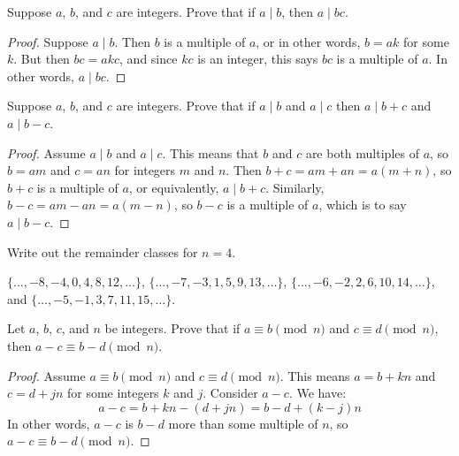 
\begin{questions}
\question Suppose $a$, $b$, and $c$ are integers.  Prove that if $a \mid b$, then $a \mid bc$.

	\begin{answer}
		\begin{proof}
			Suppose $a \mid b$.  Then $b$ is a multiple of $a$, or in other words, $b = ak$ for some $k$.  But then $bc = akc$, and since $kc$ is an integer, this says $bc$ is a multiple of $a$.  In other words, $a \mid bc$.
		\end{proof}
	\end{answer}
	
	
	
	
	

\question Suppose $a$, $b$, and $c$ are integers.  Prove that if $a \mid b$ and $a \mid c$ then $a \mid b+c$ and $a \mid b-c$.

	\begin{answer}
		\begin{proof}
			Assume $a \mid b$ and $a \mid c$.  This means that $b$ and $c$ are both multiples of $a$, so $b = am$ and $c = an$ for integers $m$ and $n$.  Then $b+c = am+an = a(m+n)$, so $b+c$ is a multiple of $a$, or equivalently, $a \mid b+c$.  Similarly, $b-c = am-an = a(m-n)$, so $b-c$ is a multiple of $a$, which is to say $a \mid b-c$.
		\end{proof}
	\end{answer}
	






\question Write out the remainder classes for $n = 4$.

	\begin{answer}
		$\{\ldots, -8, -4, 0, 4, 8, 12, \ldots\}$, $\{\ldots, -7, -3, 1, 5, 9, 13, \ldots\}$, $\{\ldots, -6, -2, 2, 6, 10, 14, \ldots\}$,\\ and $\{\ldots, -5, -1, 3, 7, 11, 15, \ldots\}$.
	\end{answer}
	
	





\question Let $a$, $b$, $c$, and $n$ be integers.  Prove that if $a \equiv b \pmod{n}$ and $c \equiv d \pmod{n}$, then $a-c \equiv b-d \pmod{n}$.

	\begin{answer}
		\begin{proof}
			Assume $a \equiv b \pmod n$ and $c \equiv d \pmod n$.  This means $a = b + kn$ and $c = d + jn$ for some integers $k$ and $j$.  Consider $a-c$.  We have:
			\[a-c = b+kn - (d+jn) = b-d + (k-j)n\]
			In other words, $a-c$ is $b-d$ more than some multiple of $n$, so $a-c \equiv b-d \pmod n$.
		\end{proof}
	\end{answer}	
	






\end{questions}
